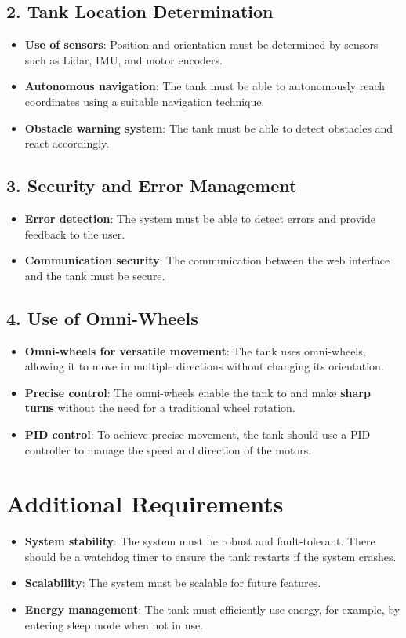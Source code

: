 \documentclass[a4paper,12pt]{article}
\begin{document}
\subsection*{2. Tank Location Determination}
\begin{itemize}
    \item \textbf{Use of sensors}: Position and orientation must be determined by sensors such as Lidar, IMU, and motor encoders.
    \item \textbf{Autonomous navigation}: The tank must be able to autonomously reach coordinates using a suitable navigation technique.
    \item \textbf{Obstacle warning system}: The tank must be able to detect obstacles and react accordingly.
\end{itemize}

\subsection*{3. Security and Error Management}
\begin{itemize}
    \item \textbf{Error detection}: The system must be able to detect errors and provide feedback to the user.
    \item \textbf{Communication security}: The communication between the web interface and the tank must be secure.
\end{itemize}

\subsection*{4. Use of Omni-Wheels}
\begin{itemize}
    \item \textbf{Omni-wheels for versatile movement}: The tank uses omni-wheels, allowing it to move in multiple directions without changing its orientation.
    \item \textbf{Precise control}: The omni-wheels enable the tank to  and make \textbf{sharp turns} without the need for a traditional wheel rotation.
    \item \textbf{PID control}: To achieve precise movement, the tank should use a PID controller to manage the speed and direction of the motors.
\end{itemize}

\section*{Additional Requirements}
\begin{itemize}
    \item \textbf{System stability}: The system must be robust and fault-tolerant. There should be a watchdog timer to ensure the tank restarts if the system crashes.
    \item \textbf{Scalability}: The system must be scalable for future features.
    \item \textbf{Energy management}: The tank must efficiently use energy, for example, by entering sleep mode when not in use.
\end{itemize}
\end{document}
